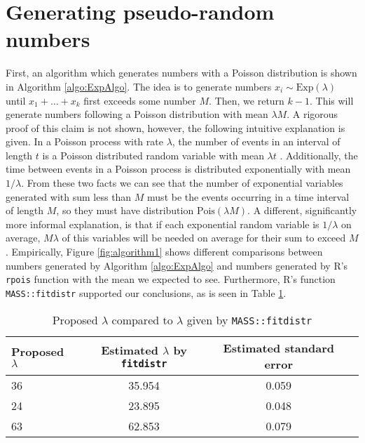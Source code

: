 \documentclass[letterpaper, 10 pt, conference]{article}
\begin{document}
\section{Generating pseudo-random numbers}
First, an algorithm which generates numbers with a Poisson distribution is shown in Algorithm \ref{algo:ExpAlgo}. The idea is to generate numbers $x_i \sim \mathrm{Exp}(\lambda)$ until $x_1 + \dots + x_k$ first exceeds some number $M$. Then, we return $k - 1$. This will generate numbers following a Poisson distribution with mean $\lambda M$. A rigorous proof of this claim is not shown, however, the following intuitive explanation is given. In a Poisson process with rate $\lambda$, the number of events in an interval of length $t$ is a Poisson distributed random variable with mean $\lambda t$ \cite{Ross_2000}. Additionally, the time between events in a Poisson process is distributed exponentially with mean $1/\lambda$. From these two facts we can see that the number of exponential variables generated with sum less than $M$ must be the events occurring in a time interval of length $M$, so they must have distribution $\mathrm{Pois}(\lambda M)$. A different, significantly more informal explanation, is that if each exponential random variable is $1/\lambda$ on average,  $M \lambda$ of this variables will be needed on average for their sum to exceed $M$. 
Empirically, Figure \ref{fig:algorithm1} shows different comparisons between numbers generated by Algorithm \ref{algo:ExpAlgo} and numbers generated by R's \texttt{rpois} function with the mean we expected to see. Furthermore, R's function \texttt{MASS::fitdistr} supported our conclusions, as is seen in Table \ref{tab:fitdistr_results}.

\begin{table}[t]
	\centering
	\caption{Proposed $\lambda$ compared to $\lambda$ given by \texttt{MASS::fitdistr}}
	\begin{tabular}{l c c c}
		\hline
		 Proposed $\lambda$ & Estimated $\lambda$ by \texttt{fitdistr} & Estimated standard error\\ 
		\hline
		36 & 35.954 & 0.059 \\ 
		24 &  23.895 & 0.048 \\ 
		63 &  62.853 & 0.079 \\
		\hline
	\end{tabular}
	\label{tab:fitdistr_results}
\end{table}
\end{document}
